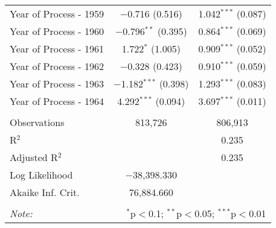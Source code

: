 \begin{table}[!h]
\begin{tabular}{@{\extracolsep{5pt}}lcc}
  Year of Process - 1959 & $-$0.716 (0.516) & 1.042$^{***}$ (0.087) \\ 
  Year of Process - 1960 & $-$0.796$^{**}$ (0.395) & 0.864$^{***}$ (0.069) \\ 
  Year of Process - 1961 & 1.722$^{*}$ (1.005) & 0.909$^{***}$ (0.052) \\ 
  Year of Process - 1962 & $-$0.328 (0.423) & 0.910$^{***}$ (0.059) \\ 
  Year of Process - 1963 & $-$1.182$^{***}$ (0.398) & 1.293$^{***}$ (0.083) \\ 
  Year of Process - 1964 & 4.292$^{***}$ (0.094) & 3.697$^{***}$ (0.011) \\ 
 \hline \\[-1.8ex] 
Observations & 813,726 & 806,913 \\ 
R$^{2}$ &  & 0.235 \\ 
Adjusted R$^{2}$ &  & 0.235 \\ 
Log Likelihood & $-$38,398.330 &  \\ 
Akaike Inf. Crit. & 76,884.660 &  \\ 
\hline 
\hline \\[-1.8ex] 
\textit{Note:}  & \multicolumn{2}{r}{$^{*}$p$<$0.1; $^{**}$p$<$0.05; $^{***}$p$<$0.01} \\ 
\end{tabular} 
\end{table} 
